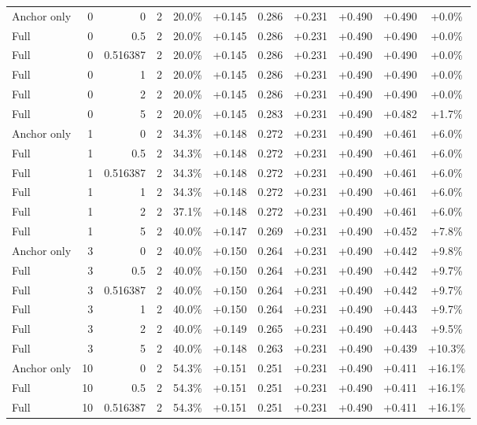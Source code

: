 \begin{table}[htbp]
\begin{tabular}{lrrrccccccc}
Anchor only & 0 & 0 & 2 & 20.0\% & +0.145 & 0.286 & +0.231 & +0.490 & +0.490 & +0.0\% \\
Full & 0 & 0.5 & 2 & 20.0\% & +0.145 & 0.286 & +0.231 & +0.490 & +0.490 & +0.0\% \\
Full & 0 & 0.516387 & 2 & 20.0\% & +0.145 & 0.286 & +0.231 & +0.490 & +0.490 & +0.0\% \\
Full & 0 & 1 & 2 & 20.0\% & +0.145 & 0.286 & +0.231 & +0.490 & +0.490 & +0.0\% \\
Full & 0 & 2 & 2 & 20.0\% & +0.145 & 0.286 & +0.231 & +0.490 & +0.490 & +0.0\% \\
Full & 0 & 5 & 2 & 20.0\% & +0.145 & 0.283 & +0.231 & +0.490 & +0.482 & +1.7\% \\
Anchor only & 1 & 0 & 2 & 34.3\% & +0.148 & 0.272 & +0.231 & +0.490 & +0.461 & +6.0\% \\
Full & 1 & 0.5 & 2 & 34.3\% & +0.148 & 0.272 & +0.231 & +0.490 & +0.461 & +6.0\% \\
Full & 1 & 0.516387 & 2 & 34.3\% & +0.148 & 0.272 & +0.231 & +0.490 & +0.461 & +6.0\% \\
Full & 1 & 1 & 2 & 34.3\% & +0.148 & 0.272 & +0.231 & +0.490 & +0.461 & +6.0\% \\
Full & 1 & 2 & 2 & 37.1\% & +0.148 & 0.272 & +0.231 & +0.490 & +0.461 & +6.0\% \\
Full & 1 & 5 & 2 & 40.0\% & +0.147 & 0.269 & +0.231 & +0.490 & +0.452 & +7.8\% \\
Anchor only & 3 & 0 & 2 & 40.0\% & +0.150 & 0.264 & +0.231 & +0.490 & +0.442 & +9.8\% \\
Full & 3 & 0.5 & 2 & 40.0\% & +0.150 & 0.264 & +0.231 & +0.490 & +0.442 & +9.7\% \\
Full & 3 & 0.516387 & 2 & 40.0\% & +0.150 & 0.264 & +0.231 & +0.490 & +0.442 & +9.7\% \\
Full & 3 & 1 & 2 & 40.0\% & +0.150 & 0.264 & +0.231 & +0.490 & +0.443 & +9.7\% \\
Full & 3 & 2 & 2 & 40.0\% & +0.149 & 0.265 & +0.231 & +0.490 & +0.443 & +9.5\% \\
Full & 3 & 5 & 2 & 40.0\% & +0.148 & 0.263 & +0.231 & +0.490 & +0.439 & +10.3\% \\
Anchor only & 10 & 0 & 2 & 54.3\% & +0.151 & 0.251 & +0.231 & +0.490 & +0.411 & +16.1\% \\
Full & 10 & 0.5 & 2 & 54.3\% & +0.151 & 0.251 & +0.231 & +0.490 & +0.411 & +16.1\% \\
Full & 10 & 0.516387 & 2 & 54.3\% & +0.151 & 0.251 & +0.231 & +0.490 & +0.411 & +16.1\% \\

\end{tabular}
\end{table}
